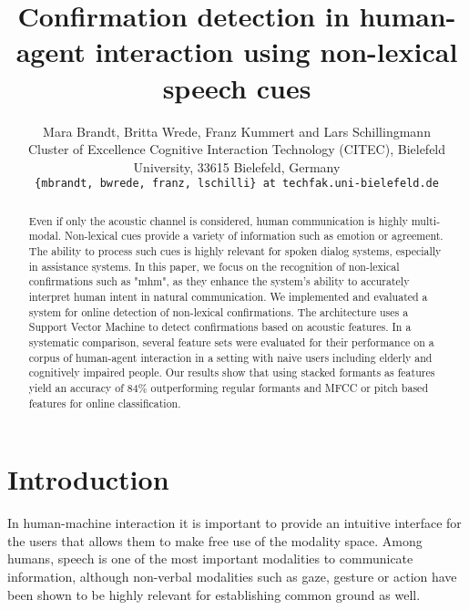 \documentclass[letterpaper]{article}
\title{Confirmation detection in human-agent interaction using non-lexical speech cues}
\author{Mara Brandt, Britta Wrede, Franz Kummert and Lars Schillingmann\\ Cluster of Excellence Cognitive Interaction Technology (CITEC), Bielefeld University, 33615 Bielefeld, Germany \\ \texttt{\{mbrandt, bwrede, franz, lschilli\} at techfak.uni-bielefeld.de}}
\begin{document}
\maketitle

\begin{abstract}
Even if only the acoustic channel is considered, human communication is highly multi-modal. Non-lexical cues provide a variety of information such as emotion or agreement.
The ability to process such cues is highly relevant for spoken dialog systems, especially in assistance systems. In this paper, we focus on the recognition of non-lexical confirmations such as "mhm", as they enhance the system's ability to accurately interpret human intent in natural communication.
We implemented and evaluated a system for online detection of non-lexical confirmations. The architecture uses a Support Vector Machine to detect confirmations based on acoustic features. In a systematic comparison, several feature sets were evaluated for their performance on a corpus of human-agent interaction in a setting with naive users including elderly and cognitively impaired people. Our results show that using stacked formants as features yield an accuracy of 84\% outperforming regular formants and MFCC or pitch based features for online classification.
\end{abstract}

\section{Introduction}\label{sec:Introduction}


In human-machine interaction it is important to provide an intuitive interface for the users that allows them to make free use of the modality space. 
Among humans, speech is one of the most important modalities to communicate information, although non-verbal modalities such as gaze, gesture or action have been shown to be highly relevant for establishing common ground as well. 
\end{document}
